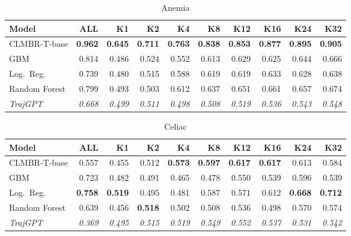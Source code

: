 \documentclass{article}
\newcommand{\B}[1]{\textbf{#1}}
\newcommand{\IT}[1]{\textit{#1}}
\begin{document}
\begin{table}[ht]
\centering\caption{Anemia}
\begin{tabular}{l *{9}{r}}
\toprule
\textbf{Model} & \textbf{ALL} & \textbf{K1} & \textbf{K2} & \textbf{K4} & \textbf{K8} & \textbf{K12} & \textbf{K16} & \textbf{K24} & \textbf{K32} \\
\midrule
CLMBR-T-base  & \B{0.962} & \B{0.645} & \B{0.711} & \B{0.763} & \B{0.838} & \B{0.853} & \B{0.877} & \B{0.895} & \B{0.905} \\
GBM           & 0.814     & 0.486     & 0.524     & 0.552     & 0.613     & 0.629     & 0.625     & 0.644     & 0.666     \\
Log.\ Reg.    & 0.739     & 0.480     & 0.515     & 0.588     & 0.619     & 0.619     & 0.633     & 0.628     & 0.638     \\
Random Forest & 0.799     & 0.493     & 0.503     & 0.612     & 0.637     & 0.651     & 0.661     & 0.657     & 0.674     \\
\IT{TrajGPT}  & \IT{0.668} & \IT{0.499} & \IT{0.511} & \IT{0.498} & \IT{0.508} & \IT{0.519} & \IT{0.536} & \IT{0.543} & \IT{0.548} \\
\bottomrule
\end{tabular}
\end{table}

\begin{table}[ht]
\centering\caption{Celiac}
\begin{tabular}{l *{9}{r}}
\toprule
\textbf{Model} & \textbf{ALL} & \textbf{K1} & \textbf{K2} & \textbf{K4} & \textbf{K8} & \textbf{K12} & \textbf{K16} & \textbf{K24} & \textbf{K32} \\
\midrule
CLMBR-T-base  & 0.557     & 0.455     & 0.512     & \B{0.573} & \B{0.597} & \B{0.617} & \B{0.617} & 0.613     & 0.584     \\
GBM           & 0.723     & 0.482     & 0.491     & 0.465     & 0.478     & 0.550     & 0.539     & 0.596     & 0.539     \\
Log.\ Reg.    & \B{0.758} & \B{0.519} & 0.495     & 0.481     & 0.587     & 0.571     & 0.612     & \B{0.668} & \B{0.712} \\
Random Forest & 0.639     & 0.456     & \B{0.518} & 0.502     & 0.508     & 0.536     & 0.498     & 0.570     & 0.574     \\
\IT{TrajGPT}  & \IT{0.369} & \IT{0.495} & \IT{0.515} & \IT{0.519} & \IT{0.549} & \IT{0.552} & \IT{0.537} & \IT{0.531} & \IT{0.542} \\
\bottomrule
\end{tabular}
\end{table}
\end{document}
